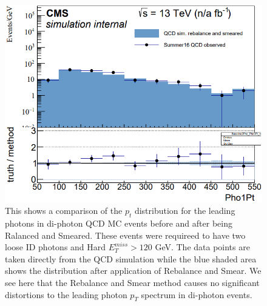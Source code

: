 \begin{figure}[h]
	\centering
	\includegraphics[width=0.9\linewidth]{Figures/RandS_Pho1_closure}
	\caption[Leading photon $p_T$ distrubutions for di-photon QCD MC events before and after Rebalance and Smear implimentation.]{This shows a comparison of the $p_t$ distribution for the leading photons in di-photon QCD MC events before and after being Ralanced and Smeared. These events were requireed to have two loose ID photons and Hard $E_T^{miss}>120$ GeV. The data points are taken directly from the QCD simulation while the blue shaded area shows the distribution after application of Rebalance and Smear. We see here that the Rebalance and Smear method causes no significant distortions to the leading photon $p_T$ spectrum in di-photon events.}
	\label{fig:randspho1closure}
\end{figure}
